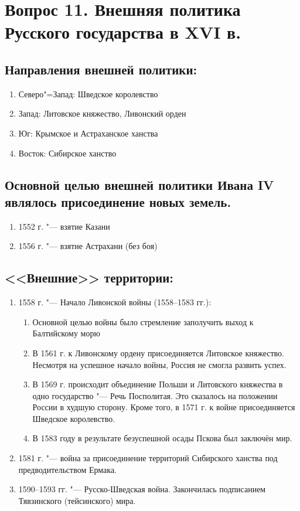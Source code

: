 \section{Вопрос 11. Внешняя политика Русского государства в XVI в.}

\subsection{Направления внешней политики:}

\begin{enumerate}
    \item{ Северо"=Запад: Шведское королевство }
    \item{ Запад: Литовское княжество, Ливонский орден }
    \item{ Юг: Крымское и Астраханское ханства }
    \item{ Восток: Сибирское ханство }
\end{enumerate}

\subsection{Основной целью внешней политики Ивана IV являлось присоединение новых земель.}

\begin{enumerate}
    \item{ 1552 г. "--- взятие Казани }
    \item{ 1556 г. "--- взятие Астрахани (без боя) }
\end{enumerate} 

\subsection{<<Внешние>> территории:}

\begin{enumerate}
    \item{ 1558 г. "--- Начало Ливонской войны (1558--1583 гг.):
        \begin{enumerate}
            \item{ Основной целью войны было стремление заполучить выход к Балтийскому морю }
            \item{ В 1561 г. к Ливонскому ордену присоединяется Литовское княжество. Несмотря на успешное начало войны, Россия не смогла развить успех. }
            \item{ В 1569 г. происходит объединение Польши и Литовского княжества в одно государство "--- Речь Посполитая. Это сказалось на положении России в худшую сторону. Кроме того, в 1571 г. к войне присоединяется Шведское королевство.  }
            \item{ В 1583 году в результате безуспешной осады Пскова был заключён мир. }
        \end{enumerate}
        }
    \item{ 1581 г. "--- война за присоединение территорий Сибирского ханства под предводительством Ермака. }
    \item{ 1590--1593 гг. "--- Русско-Шведская война. Закончилась подписанием Тявзинского (тейсинского) мира. }
\end{enumerate}

